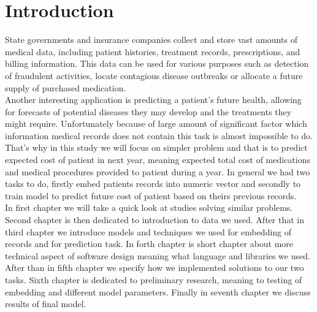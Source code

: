 
\chapter*{Introduction}

State governments and insurance companies collect and store vast amounts of medical data, including patient histories, treatment records, prescriptions, and billing information. This data can be used for various purposes such as detection of fraudulent activities, locate contagious disease outbreaks or allocate a future supply of purchased medication. 
\\

Another interesting application is predicting a patient's future health, allowing for forecasts of potential diseases they may develop and the treatments they might require. Unfortunately because of large amount of significant factor which information medical records does not contain this task is almost impossible to do.
\\

That's why in this study we will focus on simpler problem and that is to predict expected cost of patient in next year, meaning expected total cost of medications and medical procedures provided to patient during a year. In general we had two tasks to do, firstly embed patients records into numeric vector and secondly to train model to predict future cost of patient based on theirs previous records.
\\

In first chapter we will take a quick look at studies solving similar problems. Second chapter is then dedicated to introduction to data we used. After that in third chapter we introduce models and techniques we used for embedding of records and for prediction task. In forth chapter is short chapter about more technical aspect of software design meaning what language and libraries we used. After than in fifth chapter we specify how we implemented solutions to our two tasks. Sixth chapter is dedicated to preliminary research, meaning to testing of embedding and different model parameters. Finally in seventh chapter we discuss results of final model.  